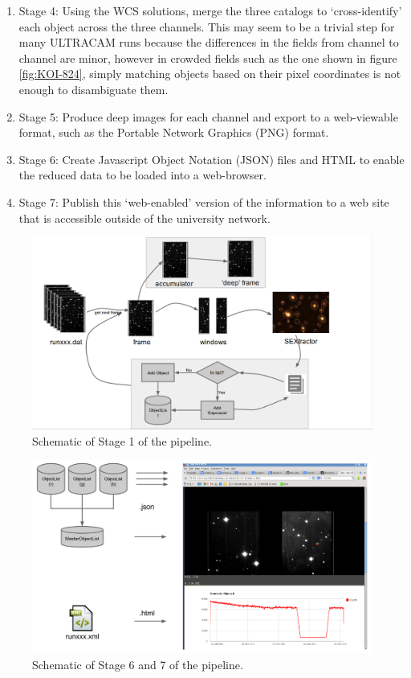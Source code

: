 \begin{enumerate}
	\item Stage 4: Using the WCS solutions, merge the three catalogs to `cross-identify' each object across the three channels. This may seem to be a trivial step for many ULTRACAM runs because the differences in the fields from channel to channel are minor, however in crowded fields such as the one shown in figure \ref{fig:KOI-824}, simply matching objects based on their pixel coordinates is not enough to disambiguate them.
	\item Stage 5: Produce deep images for each channel and export to a web-viewable format, such as the Portable Network Graphics (PNG) format. 
	\item Stage 6: Create Javascript Object Notation (JSON) files and HTML to enable the reduced data to be loaded into a web-browser.
	\item Stage 7: Publish this `web-enabled' version of the information to a web site that is accessible outside of the university network.  
		
\end{enumerate}

\begin{figure}
	\centering
	\includegraphics[width=130mm]{images/flowchart.png}
	\caption{Schematic of Stage 1 of the pipeline.}
	\label{flowchart}
\end{figure}


\begin{figure}
	\centering
	\includegraphics[width=130mm]{images/webpublish.png}
	\caption{Schematic of Stage 6 and 7 of the pipeline.}
	\label{webpublish}
\end{figure}

